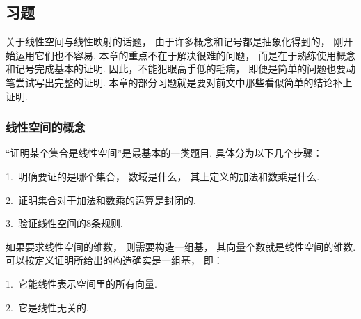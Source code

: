 \subsection{习题}

关于线性空间与线性映射的话题，
由于许多概念和记号都是抽象化得到的，
刚开始运用它们也不容易.
本章的重点不在于解决很难的问题，
而是在于熟练使用概念和记号完成基本的证明.
因此，不能犯眼高手低的毛病，
即便是简单的问题也要动笔尝试写出完整的证明.
本章的部分习题就是要对前文中那些看似简单的结论补上证明.

\subsubsection{线性空间的概念}

“证明某个集合是线性空间”是最基本的一类题目.
具体分为以下几个步骤：

    1.~明确要证的是哪个集合，
    数域是什么，
    其上定义的加法和数乘是什么.
    
    2.~证明集合对于加法和数乘的运算是封闭的.

    3.~验证线性空间的$8$条规则.

    如果要求线性空间的维数，
    则需要构造一组基，
    其向量个数就是线性空间的维数.
    可以按定义证明所给出的构造确实是一组基，
    即：

    1.~它能线性表示空间里的所有向量.

    2.~它是线性无关的.


